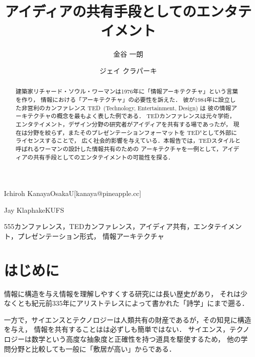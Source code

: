 \documentclass[submit,techreq,noauthor]{ipsj}
\newcommand{\TED}{\textsf{TED}}
\newcommand{\TEDx}{\TED${}^{\textsf{x}}$}
\begin{document}
\title{アイディアの共有手段としてのエンタテイメント}




\author{金谷 一朗}{Ichiroh Kanaya}{OsakaU}[kanaya@pineapple.cc]
\author{ジェイ クラパーキ}{Jay Klaphake}{KUFS}

\begin{abstract}
建築家リチャード・ソウル・ワーマンは1976年に「情報アーキテクチャ」という言葉を作り，
情報における「アーキテクチャ」の必要性を訴えた．
彼が1984年に設立した非営利のカンファレンス \TED\ (Technology, Entertainment, Design) は
彼の情報アーキテクチャの概念を最もよく表した例である．
\TED カンファレンスは元々学術，エンタテイメント，デザイン分野の研究者がアイディアを共有する場であったが，
現在は分野を絞らず，またそのプレゼンテーションフォーマットを \TEDx として外部にライセンスすることで，
広く社会的影響を与えている．本報告では，\TED スタイルと呼ばれるワーマンの設計した情報共有のための
アーキテクチャを一例として，アイディアの共有手段としてのエンタテイメントの可能性を探る．
\end{abstract}

\begin{jkeyword}
555カンファレンス，\TED カンファレンス，アイディア共有，エンタテイメント，プレゼンテーション形式，
情報アーキテクチャ
\end{jkeyword}

\maketitle

\section{はじめに}


情報に構造を与え情報を理解しやすくする研究には長い歴史があり，
それは少なくとも紀元前335年にアリストテレスによって書かれた「詩学」\cite{a}にまで遡る．

一方で，サイエンスとテクノロジーは人類共有の財産であるが，その知見に構造を与え，
情報を共有することはは必ずしも簡単ではない．
サイエンス，テクノロジーは数学という高度な抽象度と正確性を持つ道具を駆使するため，
他の学問分野と比較しても一般に「敷居が高い」からである．
\end{document}
